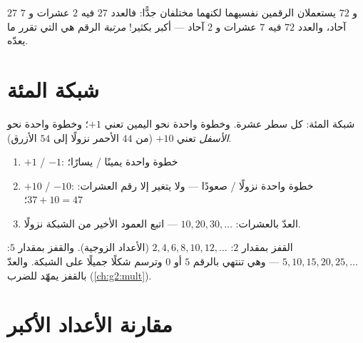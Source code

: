 \begin{example}\label{ex:g1:tens:place}
$27$ و $72$ يستعملان الرقمين نفسيهما لكنهما مختلفان جدًّا: فالعدد
$27$ فيه $2$ عشرات و $7$ آحاد، والعدد $72$ فيه $7$ عشرات و $2$ آحاد
--- أكبر بكثير! \emph{مرتبة} الرقم هي التي تقرر ما يعدّه.
\end{example}

\section{شبكة المئة}

\begin{omfigure}

{\small شبكة المئة: كل سطر عشرة. وخطوة واحدة نحو اليمين تعني
$+1$؛ وخطوة واحدة نحو \emph{الأسفل} تعني $+10$ (من $44$ الأحمر
نزولًا إلى $54$ الأزرق).}
\end{omfigure}

\begin{method}\label{met:g1:tens:grid}
\begin{enumerate}
  \item $+1$ / $-1$: خطوة واحدة يمينًا / يسارًا؛
  \item $+10$ / $-10$: خطوة واحدة نزولًا / صعودًا --- ولا يتغير
        إلا رقم العشرات: $37 + 10 = 47$؛
  \item العدّ بالعشرات: $10, 20, 30, \dots$ --- اتبع العمود
        الأخير من الشبكة نزولًا.
\end{enumerate}
\end{method}

\begin{example}\label{ex:g1:tens:skip}
القفز بمقدار $2$: $2, 4, 6, 8, 10, 12, \dots$ (الأعداد الزوجية).
والقفز بمقدار $5$: $5, 10, 15, 20, 25, \dots$ --- وهي تنتهي بالرقم $5$ أو
$0$ وترسم شكلًا جميلًا على الشبكة. والعدّ بالقفز يمهّد للضرب
(\cref{ch:g2:mult}).
\end{example}

\section{مقارنة الأعداد الأكبر}

